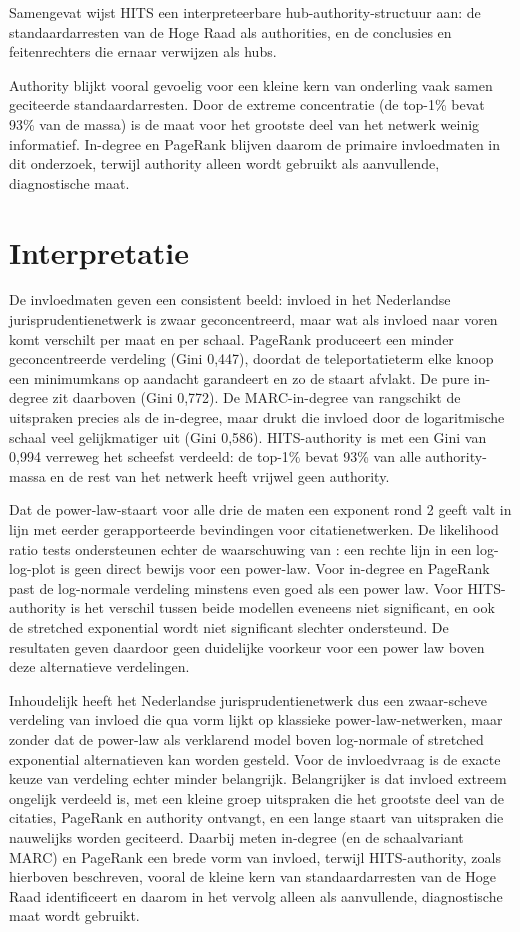 \documentclass[a4paper, 12pt]{report}
\begin{document}
Samengevat wijst HITS een interpreteerbare hub-authority-structuur aan: de standaardarresten van de Hoge Raad als authorities, en de conclusies en feitenrechters die ernaar verwijzen als hubs.

Authority blijkt vooral gevoelig voor een kleine kern van onderling vaak samen geciteerde standaardarresten. Door de extreme concentratie (de top-1\% bevat 93\% van de massa) is de maat voor het grootste deel van het netwerk weinig informatief. In-degree en PageRank blijven daarom de primaire invloedmaten in dit onderzoek, terwijl authority alleen wordt gebruikt als aanvullende, diagnostische maat.



\section{Interpretatie}
De invloedmaten geven een consistent beeld: invloed in het Nederlandse jurisprudentienetwerk is zwaar geconcentreerd, maar wat als invloed naar voren komt verschilt per maat en per schaal. PageRank produceert een minder geconcentreerde verdeling (Gini 0,447), doordat de teleportatieterm elke knoop een minimumkans op aandacht garandeert en zo de staart afvlakt. De pure in-degree zit daarboven (Gini 0,772). De MARC-in-degree van \textcite{vanopijnen2012} rangschikt de uitspraken precies als de in-degree, maar drukt die invloed door de logaritmische schaal veel gelijkmatiger uit (Gini 0,586). HITS-authority is met een Gini van 0,994 verreweg het scheefst verdeeld: de top-1\% bevat 93\% van alle authority-massa en de rest van het netwerk heeft vrijwel geen authority.

Dat de power-law-staart voor alle drie de maten een exponent rond 2 geeft valt in lijn met eerder gerapporteerde bevindingen voor citatienetwerken. De likelihood ratio tests ondersteunen echter de waarschuwing van \textcite{broido2019}: een rechte lijn in een log-log-plot is geen direct bewijs voor een power-law. Voor in-degree en PageRank past de log-normale verdeling minstens even goed als een power law. Voor HITS-authority is het verschil tussen beide modellen eveneens niet significant, en ook de stretched exponential wordt niet significant slechter ondersteund. De resultaten geven daardoor geen duidelijke voorkeur voor een power law boven deze alternatieve verdelingen.

Inhoudelijk heeft het Nederlandse jurisprudentienetwerk dus een zwaar-scheve verdeling van invloed die qua vorm lijkt op klassieke power-law-netwerken, maar zonder dat de power-law als verklarend model boven log-normale of stretched exponential alternatieven kan worden gesteld. Voor de invloedvraag is de exacte keuze van verdeling echter minder belangrijk. Belangrijker is dat invloed extreem ongelijk verdeeld is, met een kleine groep uitspraken die het grootste deel van de citaties, PageRank en authority ontvangt, en een lange staart van uitspraken die nauwelijks worden geciteerd. Daarbij meten in-degree (en de schaalvariant MARC) en PageRank een brede vorm van invloed, terwijl HITS-authority, zoals hierboven beschreven, vooral de kleine kern van standaardarresten van de Hoge Raad identificeert en daarom in het vervolg alleen als aanvullende, diagnostische maat wordt gebruikt.
\end{document}
